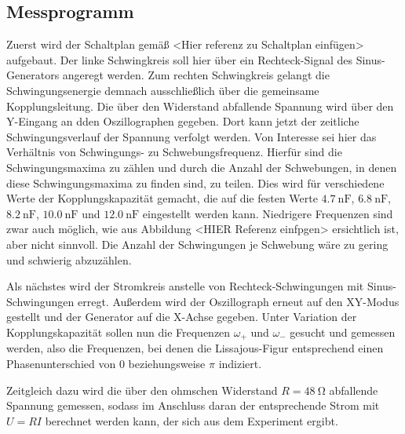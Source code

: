 \subsection{Messprogramm}
Zuerst wird der Schaltplan gemäß <Hier referenz zu Schaltplan einfügen> aufgebaut. 
Der linke Schwingkreis soll hier über ein Rechteck-Signal des Sinus-Generators angeregt werden. 
Zum rechten Schwingkreis gelangt die Schwingungsenergie demnach ausschließlich über die gemeinsame Kopplungsleitung. 
Die über den Widerstand abfallende Spannung wird über den Y-Eingang an dden Oszillographen gegeben. 
Dort kann jetzt der zeitliche Schwingungsverlauf der Spannung verfolgt werden. 
Von Interesse sei hier das Verhältnis von Schwingungs- zu Schwebungsfrequenz. 
Hierfür sind die Schwingungsmaxima zu zählen und durch die Anzahl der Schwebungen, in denen diese Schwingungsmaxima zu finden 
sind, zu teilen. 
Dies wird für verschiedene Werte der Kopplungskapazität gemacht, die auf die festen Werte $\SI{4.7}{\nano\farad}$, 
$\SI{6.8}{\nano\farad}$, $\SI{8.2}{\nano\farad}$, $\SI{10.0}{\nano\farad}$ und $\SI{12.0}{\nano\farad}$ eingestellt werden kann.
Niedrigere Frequenzen sind zwar auch möglich, wie aus Abbildung <HIER Referenz einfpgen> ersichtlich ist, aber nicht sinnvoll. 
Die Anzahl der Schwingungen je Schwebung wäre zu gering und schwierig abzuzählen. 

Als nächstes wird der Stromkreis anstelle von Rechteck-Schwingungen mit Sinus-Schwingungen erregt. 
Außerdem wird der Oszillograph erneut auf den XY-Modus gestellt und der Generator auf die X-Achse gegeben. 
Unter Variation der Kopplungskapazität sollen nun die Frequenzen $\omega _+$ und $\omega _-$ gesucht und gemessen werden, 
also die Frequenzen, bei denen die Lissajous-Figur entsprechend einen Phasenunterschied von $0$ beziehungsweise $\pi$ indiziert.

Zeitgleich dazu wird die über den ohmschen Widerstand $R=\SI{48}{\ohm}$ abfallende Spannung gemessen, sodass im Anschluss 
daran der entsprechende Strom mit $U=RI$ berechnet werden kann, der sich aus dem Experiment ergibt. 